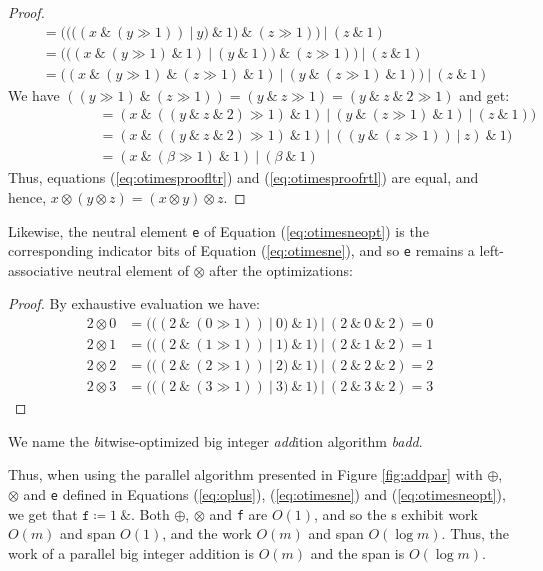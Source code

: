 \begin{proof}
\begin{align}
               &= ((((x~\&~(y \gg 1))~|~y)~\&~1)~\&~(z \gg 1))~|~(z~\&~1) \\
               &= (((x~\&~(y \gg 1)~\&~1)~|~(y~\&~1))~\&~(z \gg 1))~|~(z~\&~1) \\
               &= ((x~\&~(y \gg 1)~\&~(z \gg 1)~\&~1)~|~(y~\&~(z \gg 1)~\&~1))~|~(z~\&~1)
\end{align}
We have $((y \gg 1)~\&~(z \gg 1)) = (y~\&~z \gg 1) = (y~\&~z~\&~2 \gg 1)$ and get:
\begin{align}
  &= (x~\&~((y~\&~z~\&~2) \gg 1)~\&~1)~|~(y~\&~(z \gg 1)~\&~1)~|~(z~\&~1))\\
  \phantom{((\alpha~\&~1)\&}&= (x~\&~((y~\&~z~\&~2) \gg 1)~\&~1)~|~((y~\&~(z \gg 1))~|~z)~\&~1)\\
  &= (x~\&~(\beta \gg 1)~\&~1)~|~(\beta~\&~1)
\end{align}
Thus, equations (\ref{eq:otimesproofltr}) and (\ref{eq:otimesproofrtl}) are equal, and hence, $x \otimes (y \otimes z) = (x \otimes y) \otimes z$.
\end{proof}

Likewise, the neutral element \texttt{e} of Equation (\ref{eq:otimesneopt}) is
the corresponding indicator bits of Equation (\ref{eq:otimesne}), and so
\texttt{e} remains a left-associative neutral element of $\otimes$ after the
optimizations:

\begin{proof} By exhaustive evaluation we have:
\begin{align}
  \label{eq:otimesneproof}
  2 \otimes 0 &= (((2~\&~(0 \gg 1))~|~0)~\&~1)~|~(2~\&~0~\&~2) = 0 \\
  2 \otimes 1 &= (((2~\&~(1 \gg 1))~|~1)~\&~1)~|~(2~\&~1~\&~2) = 1 \\
  2 \otimes 2 &= (((2~\&~(2 \gg 1))~|~2)~\&~1)~|~(2~\&~2~\&~2) = 2 \\
  2 \otimes 3 &= (((2~\&~(3 \gg 1))~|~3)~\&~1)~|~(2~\&~3~\&~2) = 3
\end{align}
\end{proof}

We name the {\textit{b}}itwise-optimized big integer {\textit{add}}ition
algorithm \textit{badd}.

Thus, when using the parallel algorithm presented in Figure \ref{fig:addpar}
with $\oplus$, $\otimes$ and \texttt{e} defined in Equations (\ref{eq:oplus}),
(\ref{eq:otimesne}) and (\ref{eq:otimesneopt}), we get that
$\mathtt{f} \coloneq 1~\&$. Both $\oplus$, $\otimes$ and \texttt{f} are $O(1)$, and so the
s exhibit work $O(m)$ and span $O(1)$, and the  work $O(m)$
and span $O(\log m)$. Thus, the work of a parallel big integer addition is
$O(m)$ and the span is $O(\log m)$.


